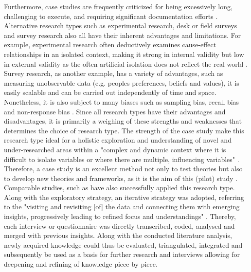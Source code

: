 Furthermore, case studies are frequently criticized for being excessively long, challenging to execute, and requiring significant documentation efforts \autocite{yinCaseStudyResearch1984}. Alternative research types such as experimental research, desk or field surveys and survey research also all have their inherent advantages and limitations. For example, experimental research often deductively examines cause-effect relationships in an isolated context, making it strong in internal validity but low in external validity as the often artificial isolation does not reflect the real world \autocite{pelzResearchMethodsSocial}. Survey research, as another example, has a variety of advantages, such as measuring unobservable data (e.g. peoples preferences, beliefs and values), it is easily scalable and can be carried out independently of time and space. Nonetheless, it is also subject to many biases such as sampling bias, recall bias and non-response bias \autocite{pelzResearchMethodsSocial}.
Since all research types have their advantages and disadvantages, it is primarily a weighing of these strengths and weaknesses that determines the choice of research type. The strength of the case study make this research type ideal for a holistic exploration and understanding of novel and under-researched areas within a "complex and dynamic context where it is difficult to isolate variables or where there are multiple, influencing variables" \autocites[2]{fitzgeraldCaseStudiesResearch1999}{zainalCaseStudyResearch2007}. Therefore, a case study is an excellent method not only to test theories but also to develop new theories and frameworks, as it is the aim of this (pilot) study \autocite{pelzResearchMethodsSocial, zainalCaseStudyResearch2007}. Comparable studies, such as \autocite{asiimweUseInnovativeAffordable2011,frigerioHandsOnExperienceCrowdsourcing2018,kohlitzRuralDrinkingWater2020,minkmanCitizenScienceWater2015,weeserCitizenSciencePioneers2018a} have also successfully applied this research type.\newline
Along with the exploratory strategy, an iterative strategy was adopted, referring to the "visiting and revisiting [of] the data and connecting them with emerging insights, progressively leading to refined focus and understandings" \autocite[77]{srivastavaPracticalIterativeFramework2009}. Thereby, each interview or questionnaire was directly transcribed, coded, analysed and merged with previous insights. Along with the conducted literature analysis, newly acquired knowledge could thus be evaluated, triangulated, integrated and subsequently be used as a basis for further research and interviews allowing for deepening and refining of knowledge piece by piece.

